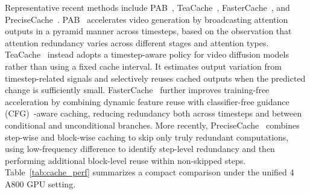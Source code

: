 \documentclass[lettersize,journal]{IEEEtran}
\begin{document}
Representative recent methods include PAB~\cite{zhao2025pab}, TeaCache~\cite{liu2024teacache}, FasterCache~\cite{lv2025fastercache}, and PreciseCache~\cite{wang2026precisecache}. PAB~\cite{zhao2025pab} accelerates video generation by broadcasting attention outputs in a pyramid manner across timesteps, based on the observation that attention redundancy varies across different stages and attention types. TeaCache~\cite{liu2024teacache} instead adopts a timestep-aware policy for video diffusion models rather than using a fixed cache interval. It estimates output variation from timestep-related signals and selectively reuses cached outputs when the predicted change is sufficiently small. FasterCache~\cite{lv2025fastercache} further improves training-free acceleration by combining dynamic feature reuse with classifier-free guidance (CFG)~\cite{ho2022classifier}-aware caching, reducing redundancy both across timesteps and between conditional and unconditional branches. More recently, PreciseCache~\cite{wang2026precisecache} combines step-wise and block-wise caching to skip only truly redundant computations, using low-frequency difference to identify step-level redundancy and then performing additional block-level reuse within non-skipped steps.
Table~\ref{tab:cache_perf} summarizes a compact comparison under the unified 4 A800 GPU setting.
\end{document}
